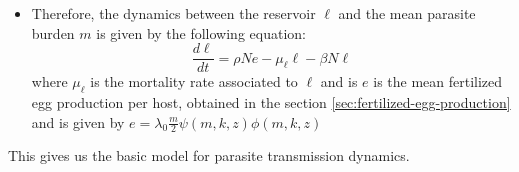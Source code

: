 \documentclass[12pt,a4paper]{article}
\theoremstyle{plain}%
\theoremstyle{definition}
\theoremstyle{remark}
\begin{document}
\begin{itemize}
	\item Therefore, the dynamics between the reservoir $\ell$ and the mean parasite burden $m$ is given by the following equation:
	\begin{equation}
	\dfrac{d\ell}{dt}=\rho N e - \mu_{\ell} \ell -\beta N \ell 
	\end{equation}
	where $\mu_{\ell}$ is the mortality rate associated to $\ell$ and  is $e$ is the mean fertilized egg production per host, obtained in the section \ref*{sec:fertilized-egg-production} and is given by $e=\lambda_0\frac{m}{2} \psi(m,k,z) \phi(m,k,z)$
	
	


\end{itemize}
This gives us the basic model for parasite transmission dynamics.

\end{document}
